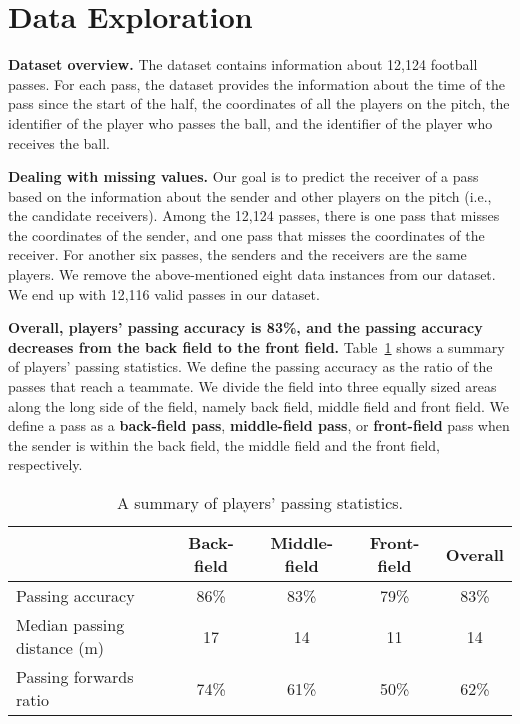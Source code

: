 \section{Data Exploration} %
\label{sec:data-exploration}

\textbf{Dataset overview.}
The dataset contains information about 12,124 football passes.
For each pass, the dataset provides the information about the time of the pass since the start of the half, the coordinates of all the players on the pitch, the identifier of the player who passes the ball, and the identifier of the player who receives the ball.

\textbf{Dealing with missing values.}
Our goal is to predict the receiver of a pass based on the information about the sender and other players on the pitch (i.e., the candidate receivers).
Among the 12,124 passes, there is one pass that misses the coordinates of the sender, and one pass that misses the coordinates of the receiver. 
For another six passes, the senders and the receivers are the same players.
We remove the above-mentioned eight data instances from our dataset.
We end up with 12,116 valid passes in our dataset.

\textbf{Overall, players' passing accuracy is 83\%, and the passing accuracy decreases from the back field to the front field.} 
Table~\ref{tab:pass-statistics} shows a summary of players' passing statistics. 
We define the passing accuracy as the ratio of the passes that reach a teammate.
We divide the field into three equally sized areas along the long side of the field, namely back field, middle field and front field.
We define a pass as a \textbf{back-field pass}, \textbf{middle-field pass}, or \textbf{front-field} pass when the sender is within the back field, the middle field and the front field, respectively.

\begin{table}[!t]
\caption{A summary of players' passing statistics.}
\centering
\renewcommand{\tabcolsep}{3pt}
\begin{tabular}{lcccc}
  \toprule
  & Back-field & Middle-field & Front-field & Overall \\
  \midrule
  Passing accuracy & 86\% & 83\% & 79\% & 83\% \\
  Median passing distance (m) & 17 & 14 & 11 & 14 \\
  Passing forwards ratio & 74\% & 61\% & 50\% & 62\% \\
  \bottomrule
\end{tabular}
\label{tab:pass-statistics}
\end{table}

